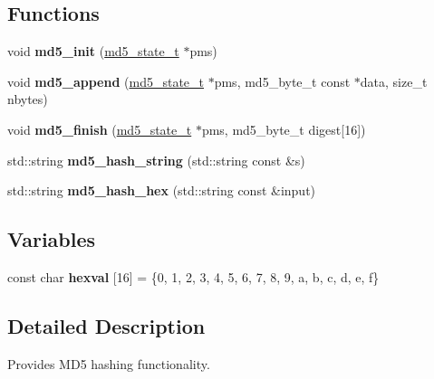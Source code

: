 \subsection*{Functions}
\begin{DoxyCompactItemize}
\item 
\mbox{\label{namespacewebsocketpp_1_1md5_a73499ae9912f813cdbb98d27b6487112}} 
void {\bfseries md5\+\_\+init} (\mbox{\hyperlink{structwebsocketpp_1_1md5_1_1md5__state__s}{md5\+\_\+state\+\_\+t}} $\ast$pms)
\item 
\mbox{\label{namespacewebsocketpp_1_1md5_afd827a71255e45a8293b9df13342ceb3}} 
void {\bfseries md5\+\_\+append} (\mbox{\hyperlink{structwebsocketpp_1_1md5_1_1md5__state__s}{md5\+\_\+state\+\_\+t}} $\ast$pms, md5\+\_\+byte\+\_\+t const $\ast$data, size\+\_\+t nbytes)
\item 
\mbox{\label{namespacewebsocketpp_1_1md5_a29e7adb892ae2de7d2c4853bc7ace034}} 
void {\bfseries md5\+\_\+finish} (\mbox{\hyperlink{structwebsocketpp_1_1md5_1_1md5__state__s}{md5\+\_\+state\+\_\+t}} $\ast$pms, md5\+\_\+byte\+\_\+t digest\mbox{[}16\mbox{]})
\item 
\mbox{\label{namespacewebsocketpp_1_1md5_ab445cdc2367665afb8fd4e983a354e0f}} 
std\+::string {\bfseries md5\+\_\+hash\+\_\+string} (std\+::string const \&s)
\item 
\mbox{\label{namespacewebsocketpp_1_1md5_a9fbd05134b509739ff15175fe7104443}} 
std\+::string {\bfseries md5\+\_\+hash\+\_\+hex} (std\+::string const \&input)
\end{DoxyCompactItemize}
\subsection*{Variables}
\begin{DoxyCompactItemize}
\item 
\mbox{\label{namespacewebsocketpp_1_1md5_a6c9cff96cd43c87cb0fc47f7d641dac8}} 
const char {\bfseries hexval} \mbox{[}16\mbox{]} = \{\textquotesingle{}0\textquotesingle{}, \textquotesingle{}1\textquotesingle{}, \textquotesingle{}2\textquotesingle{}, \textquotesingle{}3\textquotesingle{}, \textquotesingle{}4\textquotesingle{}, \textquotesingle{}5\textquotesingle{}, \textquotesingle{}6\textquotesingle{}, \textquotesingle{}7\textquotesingle{}, \textquotesingle{}8\textquotesingle{}, \textquotesingle{}9\textquotesingle{}, \textquotesingle{}a\textquotesingle{}, \textquotesingle{}b\textquotesingle{}, \textquotesingle{}c\textquotesingle{}, \textquotesingle{}d\textquotesingle{}, \textquotesingle{}e\textquotesingle{}, \textquotesingle{}f\textquotesingle{}\}
\end{DoxyCompactItemize}


\subsection{Detailed Description}
Provides M\+D5 hashing functionality. 